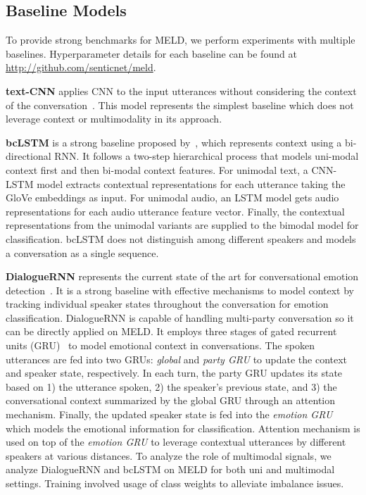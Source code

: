 \documentclass[11pt,a4paper]{article}
\begin{document}
\subsection{Baseline Models}
\label{sec:baseline_models}

To provide strong benchmarks for MELD, we perform experiments with multiple baselines. Hyperparameter details for each baseline can be found at \url{http://github.com/senticnet/meld}.

\textbf{text-CNN} applies CNN to the input utterances without considering the context of the conversation~\cite{kim2014convolutional}. This model represents the simplest baseline which does not leverage context or multimodality in its approach.

\textbf{bcLSTM} is a strong baseline proposed by~\citet{porcon}, which represents context using a bi-directional RNN. It follows a two-step hierarchical process that models uni-modal context first and then bi-modal context features. For unimodal text, a CNN-LSTM model extracts contextual representations for each utterance taking the GloVe embeddings as input. For unimodal audio, an LSTM model gets audio representations for each audio utterance feature vector. Finally, the contextual representations from the unimodal variants are supplied to the bimodal model for classification. bcLSTM does not distinguish among different speakers and models a conversation as a single sequence.

\textbf{DialogueRNN} represents the current state of the art for conversational emotion detection~\cite{majumder2018dialoguernn}. It is a strong baseline with effective mechanisms to model context by tracking individual speaker states throughout the conversation for emotion classification. DialogueRNN is capable of handling multi-party conversation so it can be directly applied on MELD. It employs three stages of gated recurrent units (GRU)~\cite{DBLP:journals/corr/ChungGCB14} to model emotional context in conversations. The spoken utterances are fed into two GRUs: \textit{global} and \textit{party GRU} to update the context and speaker state, respectively. In each turn, the party GRU updates its state based on 1) the utterance spoken, 2) the speaker's previous state, and 3) the conversational context summarized by the global GRU through an attention mechanism. Finally, the updated speaker state is fed into the \textit{emotion GRU} which models the emotional information for classification. Attention mechanism is used on top of the \textit{emotion GRU} to leverage contextual utterances by different speakers at various distances. To analyze the role of multimodal signals, we analyze DialogueRNN and bcLSTM on MELD for both uni and multimodal settings.
Training involved usage of class weights to alleviate imbalance issues.
\end{document}
